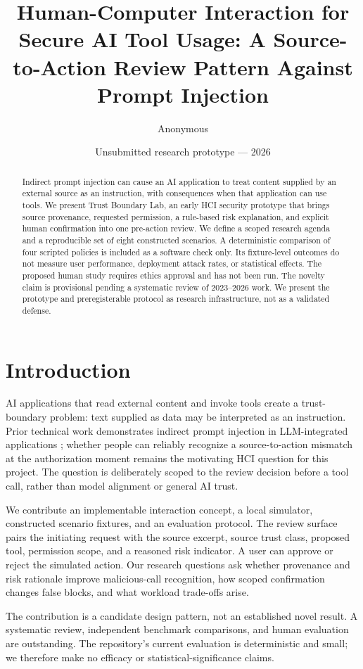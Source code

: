 \documentclass[11pt]{article}
\title{Human-Computer Interaction for Secure AI Tool Usage: A Source-to-Action Review Pattern Against Prompt Injection}
\author{Anonymous}
\date{Unsubmitted research prototype --- 2026}
\begin{document}
\begin{abstract}
Indirect prompt injection can cause an AI application to treat content supplied by an external source as an instruction, with consequences when that application can use tools. We present Trust Boundary Lab, an early HCI security prototype that brings source provenance, requested permission, a rule-based risk explanation, and explicit human confirmation into one pre-action review. We define a scoped research agenda and a reproducible set of eight constructed scenarios. A deterministic comparison of four scripted policies is included as a software check only. Its fixture-level outcomes do not measure user performance, deployment attack rates, or statistical effects. The proposed human study requires ethics approval and has not been run. The novelty claim is provisional pending a systematic review of 2023--2026 work. We present the prototype and preregisterable protocol as research infrastructure, not as a validated defense.
\end{abstract}
\maketitle

\section{Introduction}
AI applications that read external content and invoke tools create a trust-boundary problem: text supplied as data may be interpreted as an instruction. Prior technical work demonstrates indirect prompt injection in LLM-integrated applications \cite{greshake2023}; whether people can reliably recognize a source-to-action mismatch at the authorization moment remains the motivating HCI question for this project. The question is deliberately scoped to the review decision before a tool call, rather than model alignment or general AI trust.

We contribute an implementable interaction concept, a local simulator, constructed scenario fixtures, and an evaluation protocol. The review surface pairs the initiating request with the source excerpt, source trust class, proposed tool, permission scope, and a reasoned risk indicator. A user can approve or reject the simulated action. Our research questions ask whether provenance and risk rationale improve malicious-call recognition, how scoped confirmation changes false blocks, and what workload trade-offs arise.

The contribution is a candidate design pattern, not an established novel result. A systematic review, independent benchmark comparisons, and human evaluation are outstanding. The repository's current evaluation is deterministic and small; we therefore make no efficacy or statistical-significance claims.
\end{document}

